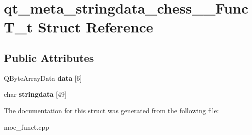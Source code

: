 \hypertarget{structqt__meta__stringdata__chess____FuncT__t}{\section{qt\-\_\-meta\-\_\-stringdata\-\_\-chess\-\_\-\-\_\-\-Func\-T\-\_\-t Struct Reference}
\label{structqt__meta__stringdata__chess____FuncT__t}
}
\subsection*{Public Attributes}
\begin{DoxyCompactItemize}
\item 
\hypertarget{structqt__meta__stringdata__chess____FuncT__t_a6f0d7bcd3bd50e9e15aa0e03f2a8a5cc}{Q\-Byte\-Array\-Data {\bfseries data} \mbox{[}6\mbox{]}}\label{structqt__meta__stringdata__chess____FuncT__t_a6f0d7bcd3bd50e9e15aa0e03f2a8a5cc}

\item 
\hypertarget{structqt__meta__stringdata__chess____FuncT__t_ae616767edadf90ae53ea548c571d8bb8}{char {\bfseries stringdata} \mbox{[}49\mbox{]}}\label{structqt__meta__stringdata__chess____FuncT__t_ae616767edadf90ae53ea548c571d8bb8}

\end{DoxyCompactItemize}


The documentation for this struct was generated from the following file\-:\begin{DoxyCompactItemize}
\item 
moc\-\_\-funct.\-cpp\end{DoxyCompactItemize}
